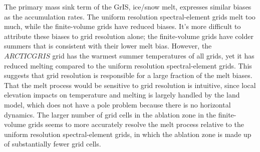 \documentclass[draft]{agujournal2019}
\begin{document}
The primary mass sink term of the GrIS, ice/snow melt, expresses similar biases as the accumulation rates. The uniform resolution spectral-element grids melt too much, while the finite-volume grids have reduced biases. It's more difficult to attribute these biases to grid resolution alone; the finite-volume grids have colder summers that is consistent with their lower melt bias. However, the $ARCTICGRIS$ grid has the warmest summer temperatures of all grids, yet it has reduced melting compared to the uniform resolution spectral-element grids. This suggests that grid resolution is responsible for a large fraction of the melt biases. That the melt process would be sensitive to grid resolution is intuitive, since local elevation impacts on temperature and melting is largely handled by the land model, which does not have a pole problem because there is no horizontal dynamics. The larger number of grid cells in the ablation zone in the finite-volume grids seems to more accurately resolve the melt process relative to the uniform resolution spectral-element grids, in which the ablation zone is made up of substantially fewer grid cells.



%
%
%
%


\end{document}
